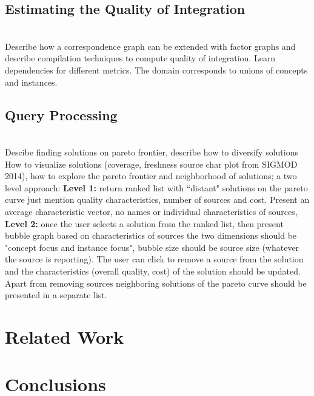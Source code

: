 \documentclass{sig-alternate}
\begin{document}
\subsection{Estimating the Quality of Integration}

\ \\Describe how a correspondence graph can be extended with factor graphs and describe compilation techniques to compute quality of integration. Learn dependencies for different metrics. The domain corresponds to unions of concepts and instances. 

\subsection{Query Processing}

\ \\Descibe finding solutions on pareto frontier, describe how to diversify solutions
\ \\How to visualize solutions (coverage, freshness source char plot from SIGMOD 2014), how to explore the pareto frontier and neighborhood of solutions; a two level approach: {\bf Level 1:} return ranked list with ``distant" solutions on the pareto curve just mention quality characteristics, number of sources and cost. Present an average characteristic vector, no names or individual characteristics of sources, {\bf Level 2:} once the user selects a solution from the ranked list, then present bubble graph based on characteristics of sources the two dimensions should be "concept focus and instance focus", bubble size should be source size (whatever the source is reporting). The user can click to remove a source from the solution and the characteristics (overall quality, cost) of the solution should be updated. Apart from removing sources neighboring solutions of the pareto curve should be presented in a separate list. 

\section{Related Work}

\section{Conclusions}



\end{document}

